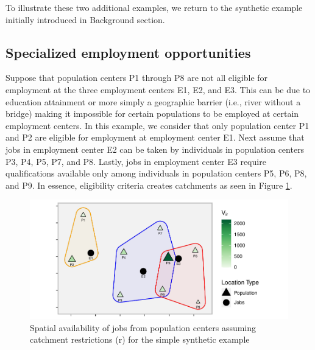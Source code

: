 \documentclass[]{elsarticle} %
\begin{document}
To illustrate these two additional examples, we return to the synthetic
example initially introduced in Background section.

\hypertarget{specialized-employment-opportunities}{%
\subsection{Specialized employment
opportunities}\label{specialized-employment-opportunities}}

Suppose that population centers P1 through P8 are not all eligible for
employment at the three employment centers E1, E2, and E3. This can be
due to education attainment or more simply a geographic barrier (i.e.,
river without a bridge) making it impossible for certain populations to
be employed at certain employment centers. In this example, we consider
that only population center P1 and P2 are eligible for employment at
employment center E1. Next assume that jobs in employment center E2 can
be taken by individuals in population centers P3, P4, P5, P7, and P8.
Lastly, jobs in employment center E3 require qualifications available
only among individuals in population centers P5, P6, P8, and P9. In
essence, eligibility criteria creates catchments as seen in Figure
\ref{fig:toy-example-availability-with-catchments}.

\begin{figure}
\includegraphics[width=1\linewidth]{Spatial-Availability_files/figure-latex/toy-example-availability-with-catchments-1} \caption{\label{fig:toy-example-availability-with-catchments}Spatial availability of jobs from population centers assuming catchment restrictions (r) for the simple synthetic example}\label{fig:toy-example-availability-with-catchments}
\end{figure}
\end{document}
